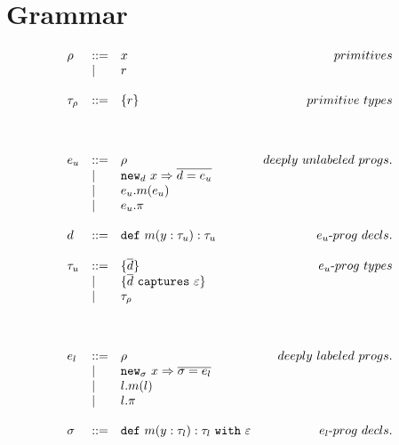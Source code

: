 \documentclass{llncs}
\newcommand{\keywadj}[1]{\mathtt{#1}}
\newcommand{\keyw}[1]{\keywadj{#1}~}
\newcommand{\kw}[1]{\keyw{ #1 }}
\newcommand{\kwa}[1]{\keywadj{ #1 }}
\newcommand{\hyphen}{\hbox{-}}
\begin{document}
\section{Grammar}

\[
\begin{array}{lll}

\begin{array}{lllr}

\rho & ::= & x & primitives\\
		& | & r \\
		&&\\
		
\tau_\rho & ::= & \{ r \} & primitive~types \\
		&&\\\\\\

e_u & ::= & \rho & deeply~unlabeled~progs. \\
 		& | & \kwa{new}_d~x \Rightarrow \overline{d = e_u} \\
 		& | & e_u.m(e_u)\\
 		& | & e_u.\pi\\
		&&\\

d & ::= & \kw{def} m(y:\tau_u):\tau_u & e_u \hyphen prog~decls.\\
		&&\\

\tau_u & ::= & \{ \overline{ d } \} & e_u \hyphen prog~types \\
	& | & \{ \overline{ d }~\kw{captures} \varepsilon \} \\
	& | & \tau_\rho \\
	&&\\\\\\





e_l & ::= & \rho & deeply~labeled~progs. \\
	& | & \kwa{new}_\sigma~x \Rightarrow \overline{\sigma = e_l} \\
	& | & l.m(l) \\
	& | & l.\pi \\
	&&\\

\sigma & ::= & \kwa{def}~m(y : \tau_l) : \tau_l~\kw{with} \varepsilon & e_l \hyphen prog~decls. \\
	&&\\


\end{array}
\end{array}\]
\end{document}

